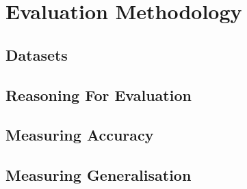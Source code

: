 \chapter{Evaluation Methodology}%
\label{eval_method}

\section{Datasets}

\section{Reasoning For Evaluation}

\section{Measuring Accuracy}

\section{Measuring Generalisation}

